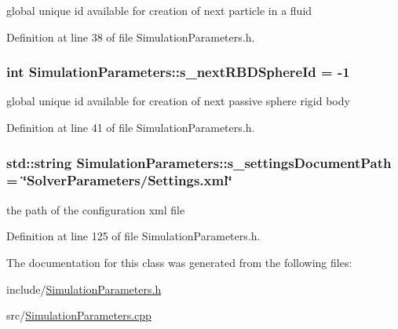 global unique id available for creation of next particle in a fluid 



Definition at line 38 of file SimulationParameters.h.

\hypertarget{class_simulation_parameters_ab66f45e106c43304340f7a5341b380b4}{
\subsubsection[{s\_\-nextRBDSphereId}]{\setlength{\rightskip}{0pt plus 5cm}int {\bf SimulationParameters::s\_\-nextRBDSphereId} = -\/1}}
\label{class_simulation_parameters_ab66f45e106c43304340f7a5341b380b4}


global unique id available for creation of next passive sphere rigid body 



Definition at line 41 of file SimulationParameters.h.

\hypertarget{class_simulation_parameters_a31c9b138fd6c5519bdd51ac56c59a303}{
\subsubsection[{s\_\-settingsDocumentPath}]{\setlength{\rightskip}{0pt plus 5cm}std::string {\bf SimulationParameters::s\_\-settingsDocumentPath} = \char`\"{}SolverParameters/Settings.xml\char`\"{}}}
\label{class_simulation_parameters_a31c9b138fd6c5519bdd51ac56c59a303}


the path of the configuration xml file 



Definition at line 125 of file SimulationParameters.h.



The documentation for this class was generated from the following files:\begin{DoxyCompactItemize}
\item 
include/\hyperlink{_simulation_parameters_8h}{SimulationParameters.h}\item 
src/\hyperlink{_simulation_parameters_8cpp}{SimulationParameters.cpp}\end{DoxyCompactItemize}
